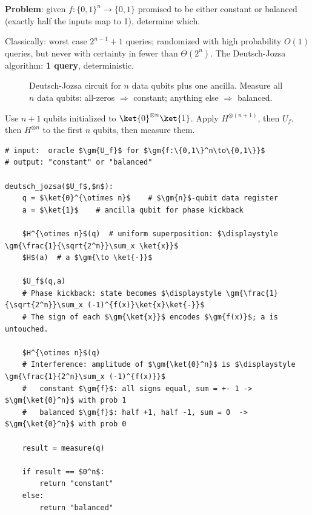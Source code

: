 \documentclass[oneside]{academica}
\begin{document}
\textbf{Problem}: given $f:\{0,1\}^n\to\{0,1\}$ promised to be either constant or balanced (exactly half the inputs map to 1), determine which.

Classically: worst case $2^{n-1}+1$ queries; randomized with high probability $O(1)$ queries, but never with certainty in fewer than $\Theta(2^n)$.
The Deutsch-Jozsa algorithm: \textbf{1 query}, deterministic.

\begin{figure}[H]
  \centering
  \caption{Deutsch-Jozsa circuit for $n$ data qubits plus one ancilla.
    Measure all $n$ data qubits: all-zeros $\Rightarrow$ constant; anything else $\Rightarrow$ balanced.
  }
\end{figure}

Use $n+1$ qubits initialized to $\ket{0}^{\otimes n}\ket{1}$.
Apply $H^{\otimes(n+1)}$, then $U_f$, then $H^{\otimes n}$ to the first $n$ qubits, then measure them.

\begin{lstlisting}
# input:  oracle $\gm{U_f}$ for $\gm{f:\{0,1\}^n\to\{0,1\}}$
# output: "constant" or "balanced"

deutsch_jozsa($U_f$,$n$):
    q = $\ket{0}^{\otimes n}$    # $\gm{n}$-qubit data register
    a = $\ket{1}$    # ancilla qubit for phase kickback

    $H^{\otimes n}$(q)  # uniform superposition: $\displaystyle \gm{\frac{1}{\sqrt{2^n}}\sum_x \ket{x}}$
    $H$(a)  # a $\gm{\to \ket{-}}$

    $U_f$(q,a)
    # Phase kickback: state becomes $\displaystyle \gm{\frac{1}{\sqrt{2^n}}\sum_x (-1)^{f(x)}\ket{x}\ket{-}}$
    # The sign of each $\gm{\ket{x}}$ encodes $\gm{f(x)}$; a is untouched.

    $H^{\otimes n}$(q)
    # Interference: amplitude of $\gm{\ket{0}^n}$ is $\displaystyle \gm{\frac{1}{2^n}\sum_x (-1)^{f(x)}}$
    #   constant $\gm{f}$: all signs equal, sum = +- 1 -> $\gm{\ket{0}^n}$ with prob 1
    #   balanced $\gm{f}$: half +1, half -1, sum = 0  -> $\gm{\ket{0}^n}$ with prob 0

    result = measure(q)

    if result == $0^n$:
        return "constant"
    else:
        return "balanced"
\end{lstlisting}
\end{document}
